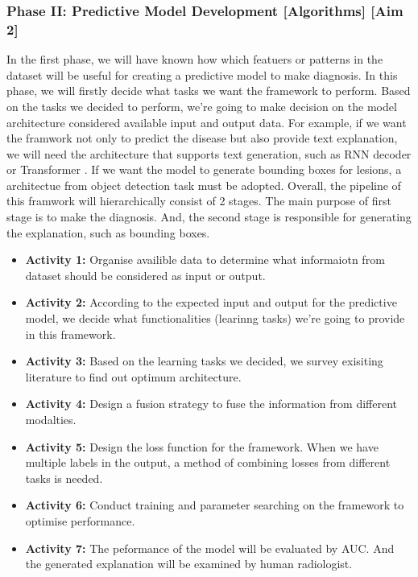 \subsubsection*{Phase II: Predictive Model Development [Algorithms] [Aim 2]}
In the first phase, we will have known how which featuers or patterns in the dataset will be useful for creating a predictive model to make diagnosis. In this phase, we will firstly decide what tasks we want the framework to perform. Based on the tasks we decided to perform, we're going to make decision on the model architecture considered available input and output data. For example, if we want the framwork not only to predict the disease but also provide text explanation, we will need the architecture that supports text generation, such as RNN decoder \citep{Sutskever2014Seq2Seq} or Transformer \citep{Vaswani2017Transformer}. If we want the model to generate bounding boxes for lesions, a architectue from object detection task must be adopted.
Overall, the pipeline of this framwork will hierarchically consist of 2 stages. The main purpose of first stage is to make the diagnosis. And, the second stage is responsible for generating the explanation, such as bounding boxes.

\begin{itemize}
    \item \textbf{Activity 1:} Organise availible data to determine what informaiotn from dataset should be considered as input or output.
    \item \textbf{Activity 2:} According to the expected input and output for the predictive model, we decide what functionalities (learinng tasks) we're going to provide in this framework.
    \item \textbf{Activity 3:} Based on the learning tasks we decided, we survey exisiting literature to find out optimum architecture.
    \item \textbf{Activity 4:} Design a fusion strategy to fuse the information from different modalties.
    \item \textbf{Activity 5:} Design the loss function for the framework. When we have multiple labels in the output, a method of combining losses from different tasks is needed.
    \item \textbf{Activity 6:} Conduct training and parameter searching on the framework to optimise performance.
    \item \textbf{Activity 7:} The peformance of the model will be evaluated by AUC. And the generated explanation will be examined by human radiologist.
\end{itemize}

